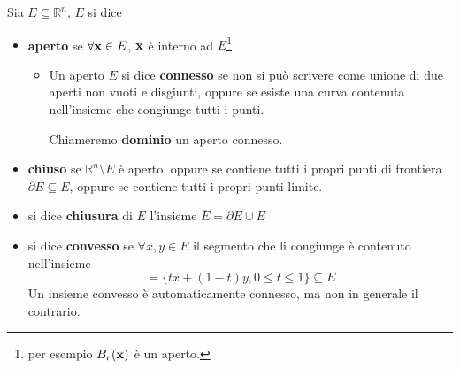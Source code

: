 Sia $E\subseteq \mathbb{R}^{n}$, $E$ si dice
\begin{itemize}
    \item \textbf{aperto} se $\forall \x\in E$, $\x$ è interno ad $E$\footnote{per esempio $B_{r}(\x)$ è un aperto.}
          \begin{itemize}
              \item Un aperto $E$ si dice \textbf{connesso} se non si può scrivere come unione di due aperti non vuoti e disgiunti, oppure se esiste una curva contenuta nell'insieme che congiunge tutti i punti.

                    Chiameremo \textbf{dominio} un aperto connesso.
          \end{itemize}
    \item \textbf{chiuso} se $\mathbb{R}^{n} \setminus E$ è aperto, oppure se contiene tutti i propri punti di frontiera $\partial E\subseteq E$, oppure se contiene tutti i propri punti limite.
    \item si dice \textbf{chiusura} di $E$ l'insieme $\displaystyle \overline{E} =\partial E\cup E$
    \item si dice \textbf{convesso} se $\forall x,y\in E$ il segmento che li congiunge è contenuto nell'insieme
          \begin{equation*}
              [ x,y] =\{tx+(1-t) y,0\leq t\leq 1\} \subseteq E
          \end{equation*}Un insieme convesso è automaticamente connesso, ma non in generale il contrario.
          \begin{figure}[htpb]
              \centering



              \begin{tikzpicture}[x=0.75pt,y=0.75pt,yscale=-1,xscale=1]


\end{tikzpicture}
\end{figure}
\end{itemize}

